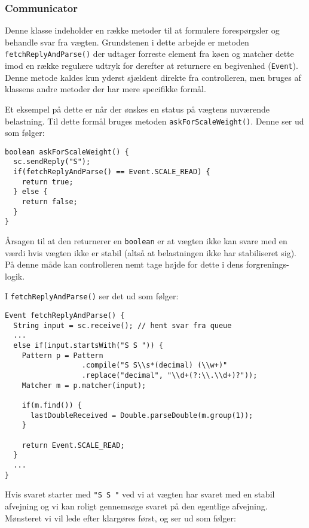 \documentclass[a4paper]{article}
\begin{document}

\subsubsection{Communicator} %

Denne klasse indeholder en række metoder til at formulere forespørgsler og behandle svar fra vægten. Grundstenen i dette arbejde er metoden \texttt{fetchReplyAndParse()} der udtager forreste element fra køen og matcher dette imod en række regulære udtryk for derefter at returnere en begivenhed (\texttt{Event}). Denne metode kaldes kun yderst sjældent direkte fra controlleren, men bruges af klassens andre metoder der har mere specifikke formål.

Et eksempel på dette er når der ønskes en status på vægtens nuværende belastning. Til dette formål bruges metoden \texttt{askForScaleWeight()}. Denne ser ud som følger:

\begin{lstlisting}
boolean askForScaleWeight() {
  sc.sendReply("S");
  if(fetchReplyAndParse() == Event.SCALE_READ) {
    return true;
  } else {
    return false;
  }
}
\end{lstlisting}

Årsagen til at den returnerer en \texttt{boolean} er at vægten ikke kan svare med en værdi hvis vægten ikke er stabil (altså at belastningen ikke har stabiliseret sig). På denne måde kan controlleren nemt tage højde for dette i dens forgrenings-logik.

I \texttt{fetchReplyAndParse()} ser det ud som følger:

\begin{lstlisting}
Event fetchReplyAndParse() {
  String input = sc.receive(); // hent svar fra queue
  ...
  else if(input.startsWith("S S ")) {
    Pattern p = Pattern
                  .compile("S S\\s*(decimal) (\\w+)"
                  .replace("decimal", "\\d+(?:\\.\\d+)?"));
    Matcher m = p.matcher(input);

    if(m.find()) {
      lastDoubleReceived = Double.parseDouble(m.group(1));
    }

    return Event.SCALE_READ;
  }
  ...
}
\end{lstlisting}

Hvis svaret starter med \texttt{"S S "} ved vi at vægten har svaret med en stabil afvejning og vi kan roligt gennemsøge svaret på den egentlige afvejning. Mønsteret vi vil lede efter klargøres først, og ser ud som følger:
\end{document}
